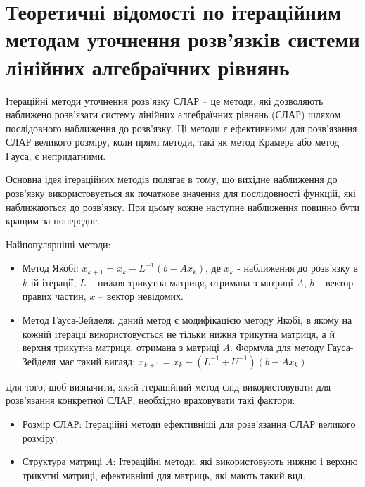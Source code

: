 \documentclass[12pt,a4paper]{article}
\begin{document}
 \section{Теоретичні відомості по ітерацiйним методам уточнення розв’язкiв системи лiнiйних алгебраїчних рiвнянь}
 \hspace{1 cm} Ітераційні методи уточнення розв’язку СЛАР – це методи, які дозволяють наближено розв’язати систему лінійних алгебраїчних рівнянь (СЛАР) шляхом послідовного наближення до розв’язку. Ці методи є ефективними для розв’язання СЛАР великого розміру, коли прямі методи, такі як метод Крамера або метод Гауса, є непридатними.

 \hspace{0.4 cm} Основна ідея ітераційних методів полягає в тому, що вихідне наближення до розв’язку використовується як початкове значення для послідовності функцій, які наближаються до розв’язку. При цьому кожне наступне наближення повинно бути кращим за попереднє.

 \hspace{0.4 cm} Найпопулярніші методи:
 \begin{itemize}
    \item Метод Якобі: \(x_{k + 1} = x_k - L^{-1} (b - A x_k)\), де \(x_k\) - наближення до розв’язку в \(k\)-ій ітерації, \(L\) – нижня трикутна матриця, отримана з матриці \(A\), \(b\) – вектор правих частин, \(x\) – вектор невідомих.
    \item Метод Гауса-Зейделя: даний метод є модифікацією методу Якобі, в якому на кожній ітерації використовується не тільки нижня трикутна матриця, а й верхня трикутна матриця, отримана з матриці \(A\). Формула для методу Гауса-Зейделя має такий вигляд: \(x_{k + 1} = x_k - (L^{-1} + U^{-1}) (b - A x_k) \)
 \end{itemize}

 \hspace{0.4 cm} Для того, щоб визначити, який ітераційний метод слід використовувати для розв’язання конкретної СЛАР, необхідно враховувати такі фактори:
 \begin{itemize}
    \item Розмір СЛАР: Ітераційні методи ефективніші для розв’язання СЛАР великого розміру.
    \item Структура матриці \(A\): Ітераційні методи, які використовують нижню і верхню трикутні матриці, ефективніші для матриць, які мають такий вид.
 \end{itemize}
\end{document}
